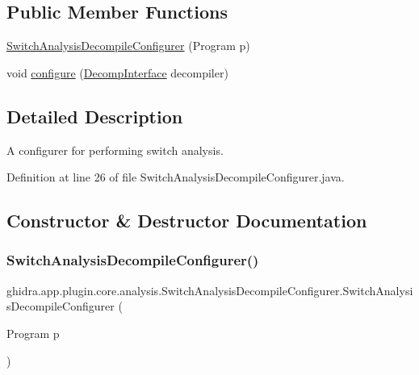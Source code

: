 \subsection*{Public Member Functions}
\begin{DoxyCompactItemize}
\item 
\mbox{\hyperlink{classghidra_1_1app_1_1plugin_1_1core_1_1analysis_1_1_switch_analysis_decompile_configurer_a8290def88c0421db55b04ef19dc55a83}{Switch\+Analysis\+Decompile\+Configurer}} (Program p)
\item 
void \mbox{\hyperlink{classghidra_1_1app_1_1plugin_1_1core_1_1analysis_1_1_switch_analysis_decompile_configurer_a3691560a6f568eee4a060f0e2656410f}{configure}} (\mbox{\hyperlink{classghidra_1_1app_1_1decompiler_1_1_decomp_interface}{Decomp\+Interface}} decompiler)
\end{DoxyCompactItemize}


\subsection{Detailed Description}
A configurer for performing switch analysis. 

Definition at line 26 of file Switch\+Analysis\+Decompile\+Configurer.\+java.



\subsection{Constructor \& Destructor Documentation}
\mbox{\label{classghidra_1_1app_1_1plugin_1_1core_1_1analysis_1_1_switch_analysis_decompile_configurer_a8290def88c0421db55b04ef19dc55a83}} 
\subsubsection{\texorpdfstring{SwitchAnalysisDecompileConfigurer()}{SwitchAnalysisDecompileConfigurer()}}
{\footnotesize\ttfamily ghidra.\+app.\+plugin.\+core.\+analysis.\+Switch\+Analysis\+Decompile\+Configurer.\+Switch\+Analysis\+Decompile\+Configurer (\begin{DoxyParamCaption}\item[{Program}]{p }\end{DoxyParamCaption})\hspace{0.3cm}{\ttfamily [inline]}}



